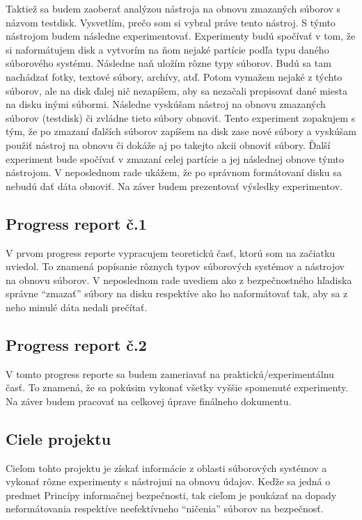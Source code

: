 \documentclass[12pt,oneside,slovak,a4paper]{article}
\begin{document}
Taktiež sa budem zaoberať analýzou nástroja na obnovu zmazaných súborov s názvom testdisk. Vysvetlím, prečo som si vybral práve tento nástroj. S týmto nástrojom budem následne experimentovať. Experimenty budú spočívať v tom, že si naformátujem disk a vytvorím na ňom nejaké partície podľa typu daného súborového systému. Následne naň uložím rôzne typy súborov. Budú sa tam nachádzať fotky, textové súbory, archívy, atď. Potom vymažem nejaké z týchto súborov, ale na disk ďalej nič nezapíšem, aby sa nezačali prepisovať dané miesta na disku inými súbormi. Následne vyskúšam nástroj na obnovu zmazaných súborov (testdisk) či zvládne tieto súbory obnoviť. Tento experiment zopakujem s tým, že po zmazaní ďalších súborov zapíšem na disk zase nové súbory a vyskúšam použiť nástroj na obnovu či dokáže aj po takejto akcii obnoviť súbory. Ďalší experiment bude spočívať v zmazaní celej partície a jej následnej obnove týmto nástrojom. V neposlednom rade ukážem, že po správnom formátovaní disku sa nebudú dať dáta obnoviť. Na záver budem prezentovať výsledky experimentov.
\subsection{Progress report č.1}
V prvom progress reporte vypracujem teoretickú časť, ktorú som na začiatku uviedol. To znamená popísanie rôznych typov súborových systémov a nástrojov na obnovu súborov. V neposlednom rade uvediem ako z bezpečnostného hľadiska správne ``zmazať'' súbory na disku respektíve ako ho naformátovať tak, aby sa z neho minulé dáta nedali prečítať.

\subsection{Progress report č.2}
V tomto progress reporte sa budem zameriavať na praktickú/experimentálnu časť. To znamená, že sa pokúsim vykonať všetky vyššie spomenuté experimenty. Na záver budem pracovať na celkovej úprave finálneho dokumentu.

\subsection{Ciele projektu}
Cieľom tohto projektu je získať informácie z oblasti súborových systémov a vykonať rôzne experimenty s nástrojmi na obnovu údajov. Keďže sa jedná o predmet Princípy informačnej bezpečnosti, tak cieľom je poukázať na dopady neformátovania respektíve neefektívneho ``ničenia'' súborov na bezpečnosť.
\end{document}
